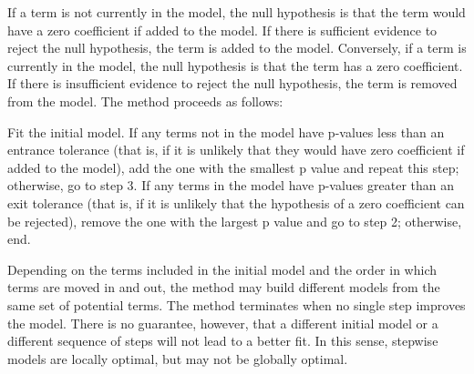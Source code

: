 If a term is not currently in the model, the null hypothesis is that the term would have a zero coefficient if added to the model. If there is sufficient evidence to reject the null hypothesis, the term is added to the model. Conversely, if a term is currently in the model, the null hypothesis is that the term has a zero coefficient. If there is insufficient evidence to reject the null hypothesis, the term is removed from the model. The method proceeds as follows:

Fit the initial model.
If any terms not in the model have p-values less than an entrance tolerance (that is, if it is unlikely that they would have zero coefficient if added to the model), add the one with the smallest p value and repeat this step; otherwise, go to step 3.
If any terms in the model have p-values greater than an exit tolerance (that is, if it is unlikely that the hypothesis of a zero coefficient can be rejected), remove the one with the largest p value and go to step 2; otherwise, end.

Depending on the terms included in the initial model and the order in which terms are moved in and out, the method may build different models from the same set of potential terms. The method terminates when no single step improves the model. There is no guarantee, however, that a different initial model or a different sequence of steps will not lead to a better fit. In this sense, stepwise models are locally optimal, but may not be globally optimal.

